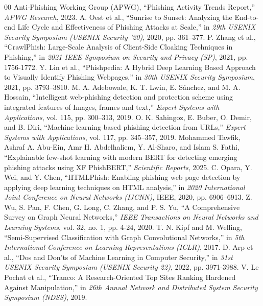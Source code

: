 \documentclass[conference]{IEEEtran}
\begin{document}
\begin{thebibliography}{00}
 Anti-Phishing Working Group (APWG), ``Phishing Activity Trends Report,'' \textit{APWG Research}, 2023.
 A. Oest et al., ``Sunrise to Sunset: Analyzing the End-to-end Life Cycle and Effectiveness of Phishing Attacks at Scale,'' in \textit{29th USENIX Security Symposium (USENIX Security '20)}, 2020, pp. 361–377.
 P. Zhang et al., ``CrawlPhish: Large-Scale Analysis of Client-Side Cloaking Techniques in Phishing,'' in \textit{2021 IEEE Symposium on Security and Privacy (SP)}, 2021, pp. 1756-1772.
 Y. Lin et al., ``Phishpedia: A Hybrid Deep Learning Based Approach to Visually Identify Phishing Webpages,'' in \textit{30th USENIX Security Symposium}, 2021, pp. 3793–3810.
 M. A. Adebowale, K. T. Lwin, E. Sánchez, and M. A. Hossain, ``Intelligent web-phishing detection and protection scheme using integrated features of Images, frames and text,'' \textit{Expert Systems with Applications}, vol. 115, pp. 300–313, 2019.
 O. K. Sahingoz, E. Buber, O. Demir, and B. Diri, ``Machine learning based phishing detection from URLs,'' \textit{Expert Systems with Applications}, vol. 117, pp. 345–357, 2019.
 Mohammed Tawfik, Ashraf A. Abu-Ein, Amr H. Abdelhaliem, Y. Al-Sharo, and Islam S. Fathi, ``Explainable few-shot learning with modern BERT for detecting emerging phishing attacks using XF PhishBERT,'' \textit{Scientific Reports}, 2025.
 C. Opara, Y. Wei, and Y. Chen, ``HTMLPhish: Enabling phishing web page detection by applying deep learning techniques on HTML analysis,'' in \textit{2020 International Joint Conference on Neural Networks (IJCNN)}, IEEE, 2020, pp. 6906–6913.
 Z. Wu, S. Pan, F. Chen, G. Long, C. Zhang, and P. S. Yu, ``A Comprehensive Survey on Graph Neural Networks,'' \textit{IEEE Transactions on Neural Networks and Learning Systems}, vol. 32, no. 1, pp. 4-24, 2020.
 T. N. Kipf and M. Welling, ``Semi-Supervised Classification with Graph Convolutional Networks,'' in \textit{5th International Conference on Learning Representations (ICLR)}, 2017.
 D. Arp et al., ``Dos and Don'ts of Machine Learning in Computer Security,'' in \textit{31st USENIX Security Symposium (USENIX Security 22)}, 2022, pp. 3971-3988.
 V. Le Pochat et al., ``Tranco: A Research-Oriented Top Sites Ranking Hardened Against Manipulation,'' in \textit{26th Annual Network and Distributed System Security Symposium (NDSS)}, 2019.

\end{thebibliography}
\end{document}
